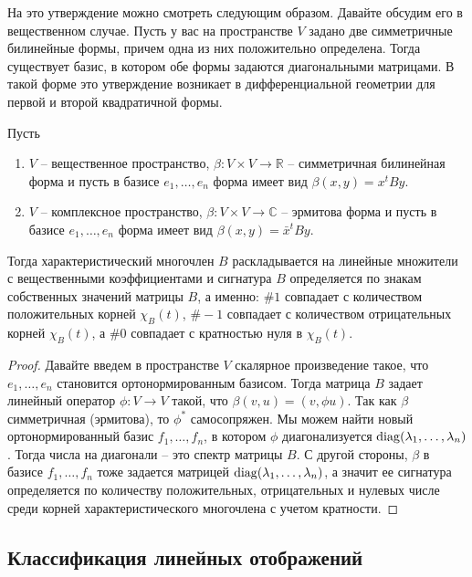 На это утверждение можно смотреть следующим образом. Давайте обсудим его в вещественном случае. Пусть у вас на пространстве $V$ задано две симметричные билинейные формы, причем одна из них положительно определена. Тогда существует базис, в котором обе формы задаются диагональными матрицами. В такой форме это утверждение возникает в дифференциальной геометрии для первой и второй квадратичной формы.

\begin{claim}
Пусть 
\begin{enumerate}
\item
$V$ -- вещественное пространство, $\beta\colon V\times V\to \mathbb R$ -- симметричная билинейная форма и пусть в базисе $e_1,\ldots,e_n$ форма имеет вид $\beta(x, y) = x^t B y$. 
\item
$V$ -- комплексное пространство, $\beta\colon V\times V\to \mathbb C$ -- эрмитова форма и пусть в базисе $e_1,\ldots,e_n$ форма имеет вид $\beta(x, y) = \bar x^t B y$. 
\end{enumerate}
Тогда характеристический многочлен $B$ раскладывается на линейные множители с вещественными коэффициентами и сигнатура $B$ определяется по знакам собственных значений матрицы $B$, а именно: $\#1$ совпадает с количеством положительных корней $\chi_B(t)$, $\#-1$ совпадает с количеством отрицательных корней $\chi_B(t)$, а $\#0$ совпадает с кратностью нуля в $\chi_B(t)$.
\end{claim}
\begin{proof}
Давайте введем в пространстве $V$ скалярное произведение такое, что $e_1,\ldots,e_n$ становится ортонормированным базисом. Тогда матрица $B$ задает линейный оператор $\phi\colon V \to V$ такой, что $\beta(v, u) = (v, \phi u)$. Так как $\beta$ симметричная (эрмитова), то $\phi^*$ самосопряжен. Мы можем найти новый ортонормированный базис $f_1,\ldots,f_n$, в котором $\phi$ диагонализуется $\operatorname{diag}(\lambda_1,\ldots,\lambda_n)$. Тогда числа на диагонали -- это спектр матрицы $B$. С другой стороны, $\beta$ в базисе $f_1,\ldots,f_n$ тоже задается матрицей $\operatorname{diag}(\lambda_1,\ldots,\lambda_n)$, а значит ее сигнатура определяется по количеству положительных, отрицательных и нулевых числе среди корней характеристического многочлена с учетом кратности.
\end{proof}

\subsection{Классификация линейных отображений}


